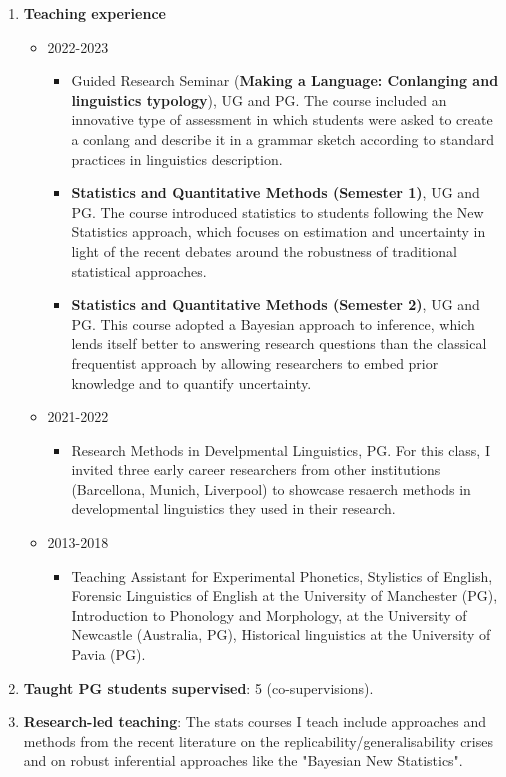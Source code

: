 \documentclass{article}
\begin{document}
\begin{enumerate}
\item \textbf{Teaching experience}
	\begin{itemize}
	\item 2022-2023
		\begin{itemize}
		\item Guided Research Seminar (\textbf{Making a Language: Conlanging and linguistics typology}), UG and PG. The course included an innovative type of assessment in which students were asked to create a conlang and describe it in a grammar sketch according to standard practices in linguistics description.
		\item \textbf{Statistics and Quantitative Methods (Semester 1)}, UG and PG. The course introduced statistics to students following the New Statistics approach, which focuses on estimation and uncertainty in light of the recent debates around the robustness of traditional statistical approaches.
		\item \textbf{Statistics and Quantitative Methods (Semester 2)}, UG and PG. This course adopted a Bayesian approach to inference, which lends itself better to answering research questions than the classical frequentist approach by allowing researchers to embed prior knowledge and to quantify uncertainty.
		\end{itemize}
	\item 2021-2022
		\begin{itemize}
		\item Research Methods in Develpmental Linguistics, PG. For this class, I invited three early career researchers from other institutions (Barcellona, Munich, Liverpool) to showcase resaerch methods in developmental linguistics they used in their research.
		\end{itemize}
	\item 2013-2018
		\begin{itemize}
		\item Teaching Assistant for Experimental Phonetics, Stylistics of English, Forensic Linguistics of English at the University of Manchester (PG), Introduction to Phonology and Morphology, at the University of Newcastle (Australia, PG), Historical linguistics at the University of Pavia (PG).
		\end{itemize}
	\end{itemize}
\item \textbf{Taught PG students supervised}: 5 (co-supervisions).
\item \textbf{Research-led teaching}: The stats courses I teach include approaches and methods from the recent literature on the replicability/generalisability crises and on robust inferential approaches like the "Bayesian New Statistics".
\end{enumerate}
\end{document}
